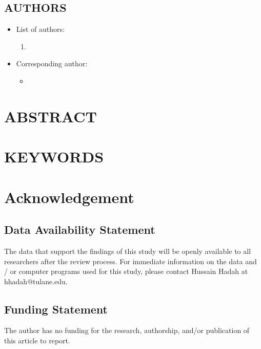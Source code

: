 \documentclass[12pt,english]{article}
\begin{document}
\subsection*{AUTHORS}
\begin{itemize}[label={}, leftmargin=*]
    \item List of authors:
    \begin{enumerate}
        \item \AUTHORHADAHINFO
    \end{enumerate}
    \item Corresponding author:
    \begin{itemize}
        \item \textbf{\AUTHORHADAHINFO}
    \end{itemize}
\end{itemize}
\clearpage 

\doublespacing
\section*{ABSTRACT}
\PAPERABSTRACT
\clearpage 

\doublespacing
\section*{KEYWORDS}
\PAPERKEYWORDS
\clearpage 


\doublespacing
\section*{Acknowledgement}
\ACKNOWLEDGMENTS
\clearpage 

\subsection*{Data Availability Statement}
The data that support the findings of this study will be openly available to all researchers after the review process. For immediate information on the data and / or computer programs used for this study, please contact Hussain Hadah at hhadah@tulane.edu.

\subsection*{Funding Statement}

The author has no funding for the research, authorship, and/or publication of this article to report.
\end{document}
